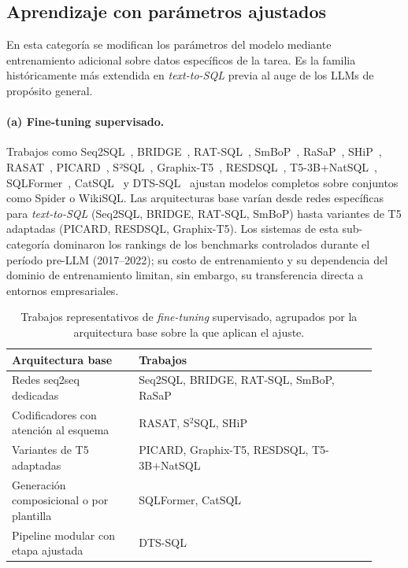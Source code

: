 \subsection{Aprendizaje con parámetros ajustados}
\label{subsec:sota-d1-tuned}

En esta categoría se modifican los parámetros del modelo mediante
entrenamiento adicional sobre datos específicos de la tarea. Es la familia
históricamente más extendida en \emph{text-to-SQL} previa al auge de los
\acp{LLM} de propósito general.

\paragraph{(a) Fine-tuning supervisado.} Trabajos como
Seq2SQL~\cite{Seq2SQL2017}, BRIDGE~\cite{BRIDGE2020},
RAT-SQL~\cite{RAT-SQL2021}, SmBoP~\cite{SmBoP2021},
RaSaP~\cite{RaSaP2021}, SHiP~\cite{SHiP2022},
RASAT~\cite{RASAT2022}, PICARD~\cite{PICARD2022},
S²SQL~\cite{S2SQL2022}, Graphix-T5~\cite{Graphix-T52022},
RESDSQL~\cite{RESDSQL2023}, T5-3B+NatSQL~\cite{T5-3B+NatSQL+TokenPreprocessing2023},
SQLFormer~\cite{SQLFormer2023}, CatSQL~\cite{CatSQL2023} y
DTS-SQL~\cite{DTS-SQL2024} ajustan modelos completos sobre conjuntos como
Spider o WikiSQL. Las arquitecturas base varían desde redes específicas para
\emph{text-to-SQL} (Seq2SQL, BRIDGE, RAT-SQL, SmBoP) hasta variantes de T5
adaptadas (PICARD, RESDSQL, Graphix-T5). Los sistemas de esta sub-categoría
dominaron los rankings de los benchmarks controlados durante el período
pre-LLM (2017--2022); su costo de entrenamiento y su dependencia del dominio
de entrenamiento limitan, sin embargo, su transferencia directa a entornos
empresariales.

\begin{table}[!htbp]
\centering
\footnotesize
\caption{Trabajos representativos de \emph{fine-tuning} supervisado, agrupados por la arquitectura base sobre la que aplican el ajuste.}
\label{tab:sota-d1-finetune}
\begin{tabular}{@{}p{0.32\linewidth}p{0.60\linewidth}@{}}
\toprule
\textbf{Arquitectura base} & \textbf{Trabajos} \\
\midrule
Redes seq2seq dedicadas & Seq2SQL, BRIDGE, RAT-SQL, SmBoP, RaSaP \\
Codificadores con atención al esquema & RASAT, S$^{2}$SQL, SHiP \\
Variantes de T5 adaptadas & PICARD, Graphix-T5, RESDSQL, T5-3B+NatSQL \\
Generación composicional o por plantilla & SQLFormer, CatSQL \\
Pipeline modular con etapa ajustada & DTS-SQL \\
\bottomrule
\end{tabular}
\end{table}

